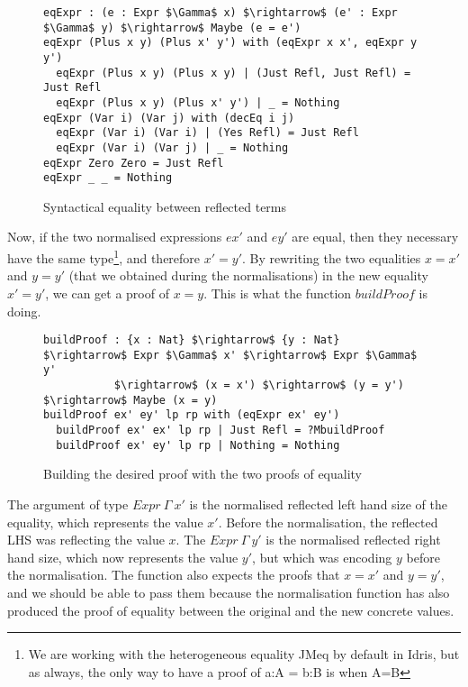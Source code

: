 \begin{figure}[H]
\figrule
\begin{center}
\begin{lstlisting}
eqExpr : (e : Expr $\Gamma$ x) $\rightarrow$ (e' : Expr $\Gamma$ y) $\rightarrow$ Maybe (e = e')
eqExpr (Plus x y) (Plus x' y') with (eqExpr x x', eqExpr y y')
  eqExpr (Plus x y) (Plus x y) | (Just Refl, Just Refl) = Just Refl
  eqExpr (Plus x y) (Plus x' y') | _ = Nothing
eqExpr (Var i) (Var j) with (decEq i j)
  eqExpr (Var i) (Var i) | (Yes Refl) = Just Refl
  eqExpr (Var i) (Var j) | _ = Nothing
eqExpr Zero Zero = Just Refl
eqExpr _ _ = Nothing
\end{lstlisting}
\end{center}
\caption{Syntactical equality between reflected terms}
\label{syntacticalEq}
\figrule
\end{figure}


Now, if the two normalised expressions $ex'$ and $ey'$ are equal, then they necessary have the same type\footnote{We are working with the heterogeneous equality JMeq by default in Idris, but as always, the only way to have a proof of a:A = b:B is when A=B}, and therefore $x'=y'$.
By rewriting the two equalities $x=x'$ and $y=y'$ (that we obtained during the normalisations) in the new equality $x'=y'$, we can get a proof of $x=y$. This is what the function $buildProof$ is doing.

\begin{figure}[H]
\figrule
\begin{center}
\begin{lstlisting}
buildProof : {x : Nat} $\rightarrow$ {y : Nat} $\rightarrow$ Expr $\Gamma$ x' $\rightarrow$ Expr $\Gamma$ y' 
           $\rightarrow$ (x = x') $\rightarrow$ (y = y') $\rightarrow$ Maybe (x = y)
buildProof ex' ey' lp rp with (eqExpr ex' ey')
  buildProof ex' ex' lp rp | Just Refl = ?MbuildProof
  buildProof ex' ey' lp rp | Nothing = Nothing
\end{lstlisting}
\end{center}
\caption{Building the desired proof with the two proofs of equality}
\label{buildProof}
\figrule
\end{figure}

The argument of type $Expr\ \Gamma\ x'$ is the normalised reflected left hand size of the equality, which represents the value $x'$. Before the normalisation, the reflected LHS was reflecting the value $x$. The $Expr\ \Gamma\ y'$ is the normalised reflected right hand size, which now represents the value $y'$, but which was encoding $y$ before the normalisation. The function also expects the proofs that $x=x'$ and $y=y'$, and we should be able to pass them because the normalisation function has also produced the proof of equality between the original and the new concrete values.

